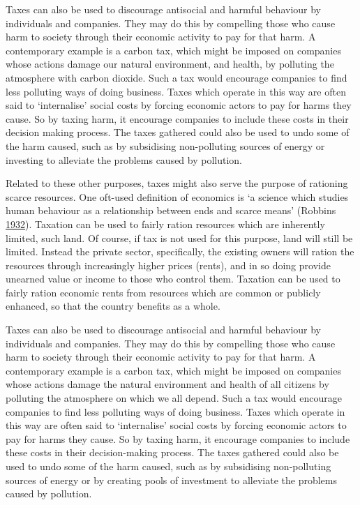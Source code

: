 \documentclass[]{tufte-handout}
\begin{document}
Taxes can also be used to discourage antisocial and harmful behaviour by
individuals and companies. They may do this by compelling those who
cause harm to society through their economic activity to pay for that
harm. A contemporary example is a carbon tax, which might be imposed on
companies whose actions damage our natural environment, and health, by
polluting the atmosphere with carbon dioxide. Such a tax would encourage
companies to find less polluting ways of doing business. Taxes which
operate in this way are often said to `internalise' social costs by
forcing economic actors to pay for harms they cause. So by taxing harm,
it encourage companies to include these costs in their decision making
process. The taxes gathered could also be used to undo some of the harm
caused, such as by subsidising non-polluting sources of energy or
investing to alleviate the problems caused by pollution.

Related to these other purposes, taxes might also serve the purpose of
rationing scarce resources. One oft-used definition of economics is `a
science which studies human behaviour as a relationship between ends and
scarce means' (Robbins \protect\hyperlink{ref-robbins1932}{1932}).
Taxation can be used to fairly ration resources which are inherently
limited, such land. Of course, if tax is not used for this purpose, land
will still be limited. Instead the private sector, specifically, the
existing owners will ration the resources through increasingly higher
prices (rents), and in so doing provide unearned value or income to
those who control them. Taxation can be used to fairly ration economic
rents from resources which are common or publicly enhanced, so that the
country benefits as a whole.

Taxes can also be used to discourage antisocial and harmful behaviour by
individuals and companies. They may do this by compelling those who
cause harm to society through their economic activity to pay for that
harm. A contemporary example is a carbon tax, which might be imposed on
companies whose actions damage the natural environment and health of all
citizens by polluting the atmosphere on which we all depend. Such a tax
would encourage companies to find less polluting ways of doing business.
Taxes which operate in this way are often said to `internalise' social
costs by forcing economic actors to pay for harms they cause. So by
taxing harm, it encourage companies to include these costs in their
decision-making process. The taxes gathered could also be used to undo
some of the harm caused, such as by subsidising non-polluting sources of
energy or by creating pools of investment to alleviate the problems
caused by pollution.
\end{document}
